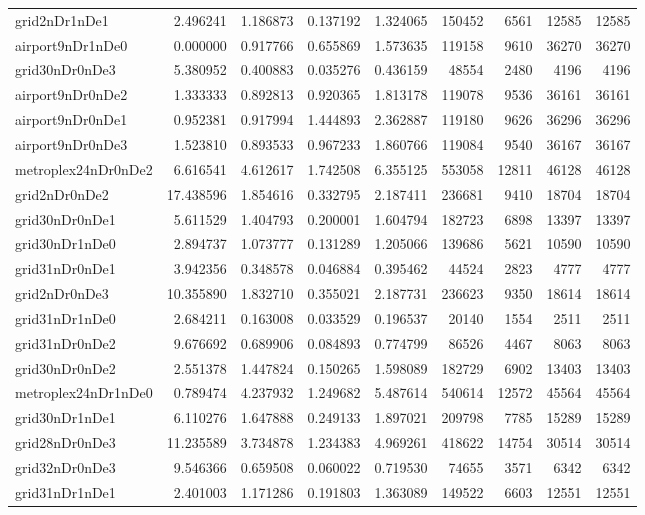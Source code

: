 \begin{longtable}{|l|r|r|r|r|r|r|r|r|}
grid2nDr1nDe1 & 2.496241 & 1.186873 & 0.137192 & 1.324065 & 150452 & 6561 & 12585 & 12585 \\
airport9nDr1nDe0 & 0.000000 & 0.917766 & 0.655869 & 1.573635 & 119158 & 9610 & 36270 & 36270 \\
grid30nDr0nDe3 & 5.380952 & 0.400883 & 0.035276 & 0.436159 & 48554 & 2480 & 4196 & 4196 \\
airport9nDr0nDe2 & 1.333333 & 0.892813 & 0.920365 & 1.813178 & 119078 & 9536 & 36161 & 36161 \\
airport9nDr0nDe1 & 0.952381 & 0.917994 & 1.444893 & 2.362887 & 119180 & 9626 & 36296 & 36296 \\
airport9nDr0nDe3 & 1.523810 & 0.893533 & 0.967233 & 1.860766 & 119084 & 9540 & 36167 & 36167 \\
metroplex24nDr0nDe2 & 6.616541 & 4.612617 & 1.742508 & 6.355125 & 553058 & 12811 & 46128 & 46128 \\
grid2nDr0nDe2 & 17.438596 & 1.854616 & 0.332795 & 2.187411 & 236681 & 9410 & 18704 & 18704 \\
grid30nDr0nDe1 & 5.611529 & 1.404793 & 0.200001 & 1.604794 & 182723 & 6898 & 13397 & 13397 \\
grid30nDr1nDe0 & 2.894737 & 1.073777 & 0.131289 & 1.205066 & 139686 & 5621 & 10590 & 10590 \\
grid31nDr0nDe1 & 3.942356 & 0.348578 & 0.046884 & 0.395462 & 44524 & 2823 & 4777 & 4777 \\
grid2nDr0nDe3 & 10.355890 & 1.832710 & 0.355021 & 2.187731 & 236623 & 9350 & 18614 & 18614 \\
grid31nDr1nDe0 & 2.684211 & 0.163008 & 0.033529 & 0.196537 & 20140 & 1554 & 2511 & 2511 \\
grid31nDr0nDe2 & 9.676692 & 0.689906 & 0.084893 & 0.774799 & 86526 & 4467 & 8063 & 8063 \\
grid30nDr0nDe2 & 2.551378 & 1.447824 & 0.150265 & 1.598089 & 182729 & 6902 & 13403 & 13403 \\
metroplex24nDr1nDe0 & 0.789474 & 4.237932 & 1.249682 & 5.487614 & 540614 & 12572 & 45564 & 45564 \\
grid30nDr1nDe1 & 6.110276 & 1.647888 & 0.249133 & 1.897021 & 209798 & 7785 & 15289 & 15289 \\
grid28nDr0nDe3 & 11.235589 & 3.734878 & 1.234383 & 4.969261 & 418622 & 14754 & 30514 & 30514 \\
grid32nDr0nDe3 & 9.546366 & 0.659508 & 0.060022 & 0.719530 & 74655 & 3571 & 6342 & 6342 \\
grid31nDr1nDe1 & 2.401003 & 1.171286 & 0.191803 & 1.363089 & 149522 & 6603 & 12551 & 12551 \\

\end{longtable}
